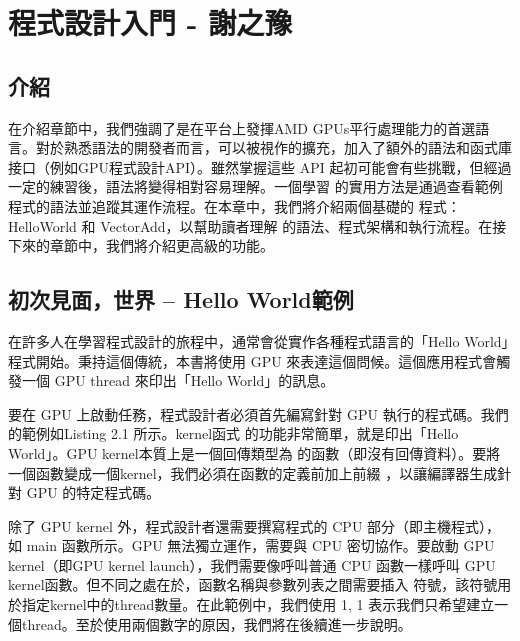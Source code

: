 \titleformat{\subsection}{\large\bfseries\CJKsection}{\thesubsection}{1em}{}

\chapter{ 程式設計入門 - 謝之豫} \label{chap:getting_started_with_hip_programming}
\section{介紹}

在介紹章節中，我們強調了是在平台上發揮AMD GPUs平行處理能力的首選語言。對於熟悉語法的開發者而言，可以被視作的擴充，加入了額外的語法和函式庫接口（例如GPU程式設計API）。雖然掌握這些 API 起初可能會有些挑戰，但經過一定的練習後，語法將變得相對容易理解。一個學習  的實用方法是通過查看範例程式的語法並追蹤其運作流程。在本章中，我們將介紹兩個基礎的  程式：HelloWorld 和 VectorAdd，以幫助讀者理解  的語法、程式架構和執行流程。在接下來的章節中，我們將介紹更高級的功能。

\section{初次見面，世界 -- Hello World範例}

在許多人在學習程式設計的旅程中，通常會從實作各種程式語言的「Hello World」程式開始。秉持這個傳統，本書將使用 GPU 來表達這個問候。這個應用程式會觸發一個 GPU thread 來印出「Hello World」的訊息。

要在 GPU 上啟動任務，程式設計者必須首先編寫針對 GPU 執行的程式碼。我們的範例如Listing 2.1 所示。kernel函式  的功能非常簡單，就是印出「Hello World」。GPU kernel本質上是一個回傳類型為  的函數（即沒有回傳資料）。要將一個函數變成一個kernel，我們必須在函數的定義前加上前綴 ，以讓編譯器生成針對 GPU 的特定程式碼。

除了 GPU kernel 外，程式設計者還需要撰寫程式的 CPU 部分（即主機程式），如 main 函數所示。GPU 無法獨立運作，需要與 CPU 密切協作。要啟動 GPU kernel（即GPU kernel launch），我們需要像呼叫普通 CPU 函數一樣呼叫 GPU kernel函數。但不同之處在於，函數名稱與參數列表之間需要插入 \code{<<<>>>} 符號，該符號用於指定kernel中的thread數量。在此範例中，我們使用 1, 1 表示我們只希望建立一個thread。至於使用兩個數字的原因，我們將在後續進一步說明。

